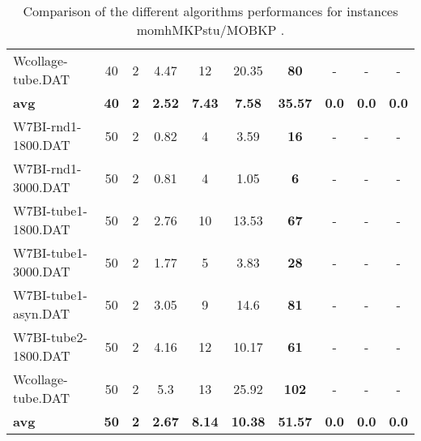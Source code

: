 \begin{table}[h]
\begin{tabular}{lccccccccc}
Wcollage-tube.DAT & 40 & 2 & 4.47 & 12 & 20.35 &  \textbf{80} &  - &  -  & - \\
\cline{1-10} \textbf{avg} & \textbf{40} & \textbf{2} & \textbf{2.52} & \textbf{7.43} & \textbf{7.58} & \textbf{35.57} & \textbf{0.0} & \textbf{0.0} & \textbf{0.0} \\ \cline{1-10}
W7BI-rnd1-1800.DAT & 50 & 2 & 0.82 & 4 & 3.59 &  \textbf{16} &  - &  -  & - \\
W7BI-rnd1-3000.DAT & 50 & 2 & 0.81 & 4 & 1.05 &  \textbf{6} &  - &  -  & - \\
W7BI-tube1-1800.DAT & 50 & 2 & 2.76 & 10 & 13.53 &  \textbf{67} &  - &  -  & - \\
W7BI-tube1-3000.DAT & 50 & 2 & 1.77 & 5 & 3.83 &  \textbf{28} &  - &  -  & - \\
W7BI-tube1-asyn.DAT & 50 & 2 & 3.05 & 9 & 14.6 &  \textbf{81} &  - &  -  & - \\
W7BI-tube2-1800.DAT & 50 & 2 & 4.16 & 12 & 10.17 &  \textbf{61} &  - &  -  & - \\
Wcollage-tube.DAT & 50 & 2 & 5.3 & 13 & 25.92 &  \textbf{102} &  - &  -  & - \\
\cline{1-10} \textbf{avg} & \textbf{50} & \textbf{2} & \textbf{2.67} & \textbf{8.14} & \textbf{10.38} & \textbf{51.57} & \textbf{0.0} & \textbf{0.0} & \textbf{0.0} \\ \cline{1-10}
\bottomrule
\end{tabular}
\caption{Comparison of the different algorithms performances for instances momhMKPstu/MOBKP .}
\label{tab:table_compare_momhMKPstu/MOBKP }
\end{table}
